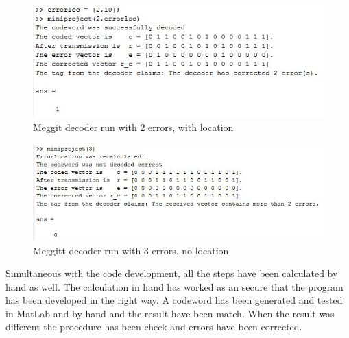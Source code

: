 \documentclass[Main]{subfiles}
\begin{document}
\begin{figure}[h!]
\centering
\includegraphics[width=0.7\linewidth]{./Picture/result-2-errors-location}
\caption{Meggit decoder run with 2 errors, with location}
\label{fig:result-2-errors-location}
\end{figure}

\begin{figure}[h!]
\centering
\includegraphics[width=0.7\linewidth]{./Picture/result-3-errors}
\caption{Meggitt decoder run with 3 errors, no location}
\label{fig:result-3-errors}
\end{figure}

Simultaneous with the code development, all the steps have been calculated by hand as well.
The calculation in hand has worked as an secure that the program has been developed in the right way.
A codeword has been generated and tested in MatLab and by hand and the result have been match.
When the result was different the procedure has been check and errors have been corrected.
\end{document}
